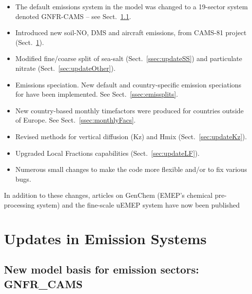 \begin{itemize}
\item The default emissions system in the model was changed to a 19-sector system denoted GNFR-CAMS -- see Sect.~\ref{ssec:gnfr}.  %

\item Introduced new soil-NO, DMS and aircraft emissions, from CAMS-81 project
(Sect.~\ref{sec:updateEmis}). 

\item Modified fine/coarse split of sea-salt (Sect.~\ref{ssec:updateSS}) and particulate nitrate (Sect.~\ref{sec:updateOther}).

\item
Emissions speciation. New default and country-specific emission
speciations for \pmfine have been implemented.  See
Sect.~\ref{ssec:emissplits}.

\item
New country-based monthly timefactors were produced for countries outside of Europe. See Sect.~\ref{ssec:monthlyFacs}.

\item Revised methods for vertical diffusion (Kz) and Hmix (Sect.~\ref{sec:updateKz}).

\item
Upgraded Local Fractions capabilities (Sect.~\ref{sec:updateLF}).

\item
Numerous small changes to make the code more flexible and/or to
fix various bugs.

\end{itemize}

In addition to these changes, articles on GenChem (EMEP's chemical pre-processing system)  and the fine-scale uEMEP system have now been published \citep{Simpson:GenChem,Denby:2020}

\section{Updates in Emission Systems}
\label{sec:updateEmis}

\subsection{New model basis for emission sectors: GNFR\_CAMS}
\label{ssec:gnfr}

 
